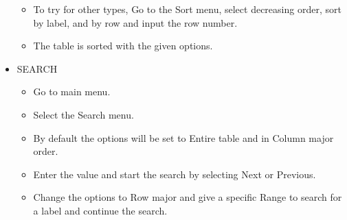 \begin{itemize}
\begin{itemize}
    \item To try for other types, Go to the Sort menu, select decreasing order, sort by label, and by row and input the row number.
    \item The table is sorted with the given options.
   \end{itemize}
  \item SEARCH
   \begin{itemize}
    \item Go to main menu.
    \item Select the Search menu.
    \item By default the options will be set to Entire table and in Column major order. 
    \item Enter the value and start the search by selecting Next or Previous.
    \item Change the options to Row major and give a specific Range to search for a label and continue the search.
   \end{itemize}
  \end{itemize}



